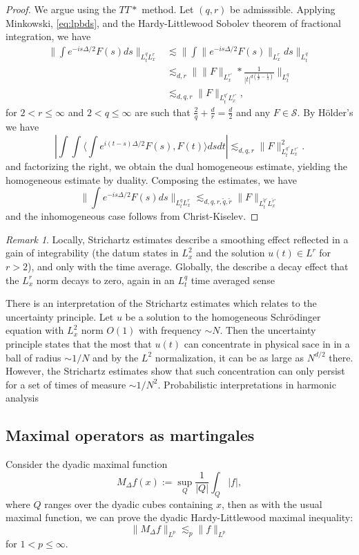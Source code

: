 \documentclass[11pt]{article}
\theoremstyle{remark}
\newtheorem*{rmk}{Remark}
\newcommand{\calS}{\mathcal{S}}
\newcommand{\1}{\textbf{1}}
\newcommand{\lle}{\lesssim}
\def\norm#1{\| #1  \|}
\def\brac#1{\langle #1  \rangle}
\begin{document}
\begin{proof}
We argue using the $TT*$ method. Let $(q,r)$ be admisssible. Applying Minkowski, \eqref{eq:lpbds}, and the Hardy-Littlewood Sobolev theorem of fractional integration, we have
\begin{align*}
\norm{\int e^{-is\Delta/2} F(s) ds}_{L^q_t L^r_x} &\lle \norm{ \int \norm{e^{-is\Delta/2} F(s)}_{L^r_x} ds }_{L^q_t}\\
& \lle_{d,r} \norm{\norm{F}_{L^{r'}_x} * \frac{1}{|t|^{d(\frac{1}{p} - \frac{1}{3})}}}_{L_t^q} \\
& \lle_{d,q,r} \norm{F}_{L_t^{q'} L_x^{r'}},
\end{align*}
for $2 < r \leq \infty$ and $2 < q \leq \infty$ are such that $\frac{2}{q} + \frac{d}{r} = \frac{d}{2}$ and any $F \in \calS$. By H\"older's we have
\[
| \int \int \brac{\int e^{i(t-s)\Delta/2} F(s), F(t)} ds dt | \lle_{d,q,r} \norm{F}^2_{L_t^{q'} L_x^{r'}}.
\]
and factorizing the right, we obtain the dual homogeneous estimate, yielding the homogeneous estimate by duality. Composing the estimates, we have
\[
\norm{\int e^{-is\Delta/2} F(s)ds }_{L^q_tL^r_x} \lle_{d,q,r, \tilde{q},\tilde{r}} \norm{F}_{L^{\tilde{q}'}_t L^{\tilde{r}'}_x}
\]
and the inhomogeneous case follows from Christ-Kiselev.
\end{proof}
\begin{rmk}
Locally, Strichartz estimates describe a smoothing effect reflected in a gain of integrability (the datum states in $L^2_x$ and the solution $u(t) \in L^r$ for $r > 2$), and only with the time average. Globally, the describe a decay effect that the $L^r_x$ norm decays to zero, again in an $L_t^q$ time averaged sense
\end{rmk}

There is an interpretation of the Strichartz estimates which relates to the uncertainty principle. Let $u$ be a solution to the homogeneous Schr\"odinger equation with $L_x^2$ norm $O(1)$ with frequency $\sim N$. Then the uncertainty principle states that the most that $u(t)$ can concentrate in physical sace in in a ball of radius $\sim 1/N$ and by the $L^2$ normalization, it can be as large as $N^{d/2}$ there. However, the Strichartz estimates show that such concentration can only persist for a set of times of measure $\sim 1/N^2$.
\newpage
{\noindent\Large Probabilistic interpretations in harmonic analysis}

\subsection*{Maximal operators as martingales}
Consider the dyadic maximal function
\[
M_\Delta f(x):= \sup_Q \frac{1}{|Q|} \int_Q |f|,
\]
where $Q$ ranges over the dyadic cubes containing $x$, then as with the usual maximal function, we can prove the dyadic Hardy-Littlewood maximal inequality:
\[
\norm{M_\Delta f}_{L^p} \lle_p \norm{f}_{L^p}
\]
for $1 < p \leq \infty$.
\end{document}
